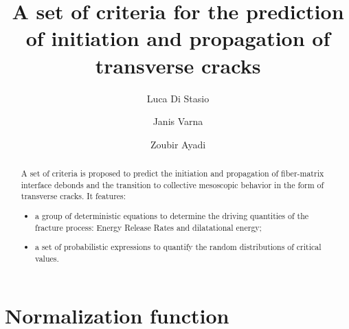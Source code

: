 \documentclass[review]{elsarticle}
\begin{document}
\begin{frontmatter}

\title{A set of criteria for the prediction of initiation and propagation of transverse cracks}


\author[nancy,lulea]{Luca Di Stasio}
\author[lulea]{Janis Varna}
\author[nancy]{Zoubir Ayadi}


\address[nancy]{Universit\'e de Lorraine, EEIGM, IJL, 6 Rue Bastien Lepage, F-54010 Nancy, France}
\address[lulea]{Lule\aa\ University of Technology, University Campus, SE-97187 Lule\aa, Sweden}

\begin{abstract}
A set of criteria is proposed to predict the initiation and propagation of fiber-matrix interface debonds and the transition to collective mesoscopic behavior in the form of transverse cracks. It features:
\begin{itemize}
\item a group of deterministic equations to determine the driving quantities of the fracture process: Energy Release Rates and dilatational energy;
\item a set of probabilistic expressions to quantify the random distributions of critical values. 
\end{itemize}
\end{abstract}


\end{frontmatter}

\linenumbers

\section{Normalization function}
\end{document}
